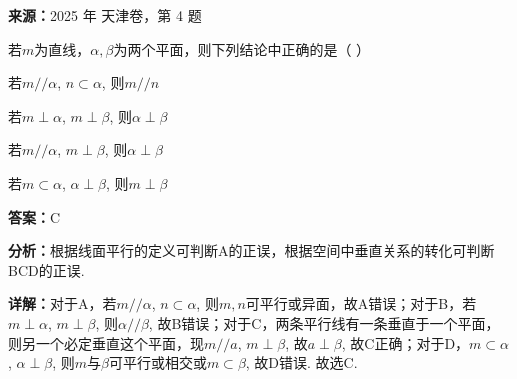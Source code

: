 \begin{question}[points=5]
\textbf{来源：}2025 年 天津卷，第 4 题\par
若$m$为直线，$\alpha, \beta$为两个平面，则下列结论中正确的是（   ）
\begin{choices}
  \item 若$m // \alpha$, $n \subset \alpha$, 则$m // n$
  \item 若$m \perp \alpha$, $m \perp \beta$, 则$\alpha \perp \beta$
  \item 若$m // \alpha$, $m \perp \beta$, 则$\alpha \perp \beta$
  \item 若$m \subset \alpha$, $\alpha \perp \beta$, 则$m \perp \beta$
\end{choices}
\begin{solution}
\textbf{答案：}C

\textbf{分析：}根据线面平行的定义可判断A的正误，根据空间中垂直关系的转化可判断BCD的正误.

\textbf{详解：}对于A，若$m // \alpha$, $n \subset \alpha$, 则$m, n$可平行或异面，故A错误；对于B，若$m \perp \alpha$, $m \perp \beta$, 则$\alpha // \beta$, 故B错误；对于C，两条平行线有一条垂直于一个平面，则另一个必定垂直这个平面，现$m // a$, $m \perp \beta$, 故$a \perp \beta$, 故C正确；对于D，$m \subset \alpha$, $\alpha \perp \beta$, 则$m$与$\beta$可平行或相交或$m \subset \beta$, 故D错误. 故选C.
\end{solution}
\end{question}

